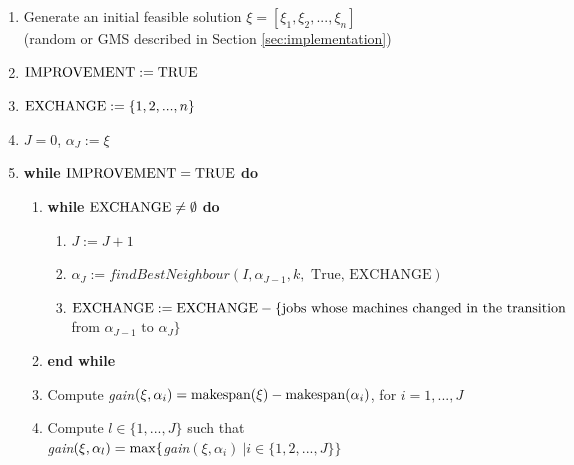 \documentclass[12pt,a4paper,reqno]{article}
\begin{document}
\begin{enumerate}
\item Generate an initial feasible solution $\xi = [\xi_1,\xi_2,...,\xi_n]$ \\ (random or GMS described in Section \ref{sec:implementation})
\item $\textnormal{IMPROVEMENT} := \textnormal{TRUE}$
\item[] $\textnormal{EXCHANGE} := \{1,2,...,n\}$
\item[] $J=0$, $\alpha_J := \xi$
\item \textbf{while} $\textnormal{IMPROVEMENT} = \textnormal{TRUE}$ \textbf{do}
\begin{enumerate}
\item \textbf{while} $\textnormal{EXCHANGE} \neq \emptyset$ \textbf{do}
\begin{enumerate}
\item $J := J+1$
\item $\alpha_J := findBestNeighbour(I,\alpha_{J-1},k,\text{ True, EXCHANGE})$
\item $\textnormal{EXCHANGE} := \textnormal{EXCHANGE} - \{\text{jobs whose machines changed in the transition}$\\
\hspace*{6cm} from $\alpha_{J-1} \text{ to } \alpha_{J}\} $
\end{enumerate}
\item[] \textbf{end while}
\item Compute \textit{gain}$(\xi,\alpha_i) = \textnormal{makespan}(\xi) - \textnormal{makespan}(\alpha_i)$, for $i=1,...,J$
\item Compute $l \in \{1,...,J\}$ such that \\ \textit{gain}$(\xi,\alpha_l) = \textnormal{max}\{$\textit{gain}$(\xi,\alpha_i) \> | i \in \{1,2,...,J\} \}$

\end{enumerate}
\end{enumerate}
\end{document}
